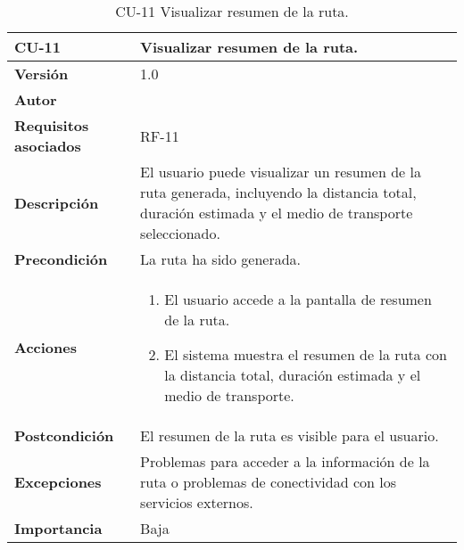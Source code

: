 \begin{table}[p]
	\centering
	\begin{tabularx}{\linewidth}{ p{} p{} }
		\toprule
		\textbf{CU-11}    & \textbf{Visualizar resumen de la ruta.}\\
		\toprule
		\textbf{Versión}              & 1.0    \\
		\textbf{Autor}                & \autor \\
		\textbf{Requisitos asociados} & RF-11 \\
		\textbf{Descripción}          & El usuario puede visualizar un resumen de la ruta generada, incluyendo la distancia total, duración estimada y el medio de transporte seleccionado. \\
		\textbf{Precondición}         & La ruta ha sido generada. \\
		\textbf{Acciones}             &
		\begin{enumerate}
			\def\labelenumi{\arabic{enumi}.}
			\tightlist
			\item El usuario accede a la pantalla de resumen de la ruta.
			\item El sistema muestra el resumen de la ruta con la distancia total, duración estimada y el medio de transporte.
		\end{enumerate}\\
		\textbf{Postcondición}        & El resumen de la ruta es visible para el usuario. \\
		\textbf{Excepciones}          & Problemas para acceder a la información de la ruta o problemas de conectividad con los servicios externos. \\
		\textbf{Importancia}          & Baja \\
		\bottomrule
	\end{tabularx}
	\caption{CU-11 Visualizar resumen de la ruta.}
\end{table}
